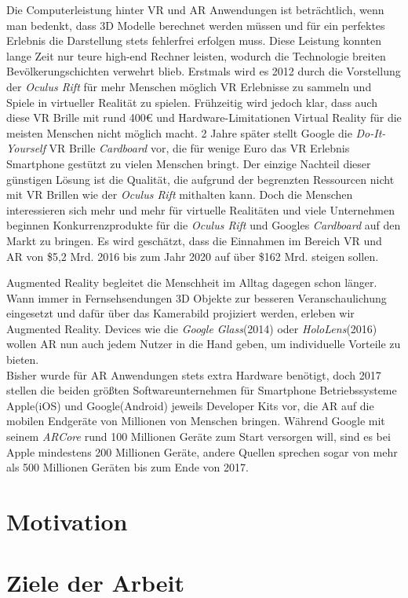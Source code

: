 Die Computerleistung hinter VR und AR Anwendungen ist beträchtlich, wenn man bedenkt, dass 3D Modelle berechnet werden müssen und für ein perfektes Erlebnis die Darstellung stets fehlerfrei erfolgen muss. Diese Leistung konnten lange Zeit nur teure high-end Rechner leisten, wodurch die Technologie breiten Bevölkerungschichten verwehrt blieb. Erstmals wird es 2012 durch die Vorstellung der \emph{Oculus Rift} für mehr Menschen möglich VR Erlebnisse zu sammeln und Spiele in virtueller Realität zu spielen. Frühzeitig wird jedoch klar, dass auch diese VR Brille mit rund 400€ und Hardware-Limitationen Virtual Reality für die meisten Menschen nicht möglich macht. 2 Jahre später stellt Google die \emph{Do-It-Yourself} VR Brille \emph{Cardboard} vor, die für wenige Euro das VR Erlebnis Smartphone gestützt zu vielen Menschen bringt. Der einzige Nachteil dieser günstigen Lösung ist die Qualität, die aufgrund der begrenzten Ressourcen nicht mit VR Brillen wie der \emph{Oculus Rift} mithalten kann. Doch die Menschen interessieren sich mehr und mehr für virtuelle Realitäten und viele Unternehmen beginnen Konkurrenzprodukte für die \emph{Oculus Rift} und Googles \emph{Cardboard} auf den Markt zu bringen. Es wird geschätzt, dass die Einnahmen im Bereich VR und AR von \$5,2 Mrd. 2016 bis zum Jahr 2020 auf über \$162 Mrd. steigen sollen.\cite{augEco_1}\par
Augmented Reality begleitet die Menschheit im Alltag dagegen schon länger. Wann immer in Fernsehsendungen 3D Objekte zur besseren Veranschaulichung eingesetzt und dafür über das Kamerabild projiziert werden, erleben wir Augmented Reality. Devices wie die \emph{Google Glass}(2014) oder \emph{HoloLens}(2016) wollen AR nun auch jedem Nutzer in die Hand geben, um individuelle Vorteile zu bieten.\\
Bisher wurde für AR Anwendungen stets extra Hardware benötigt, doch 2017 stellen die beiden größten Softwareunternehmen für Smartphone Betriebssysteme Apple(iOS) und Google(Android) jeweils Developer Kits vor, die AR auf die mobilen Endgeräte von Millionen von Menschen bringen. Während Google mit seinem \emph{ARCore} rund 100 Millionen Geräte zum Start versorgen will\cite{augGoogle_1}, sind es bei Apple mindestens 200 Millionen Geräte\cite{augApple_1}, andere Quellen sprechen sogar von mehr als 500 Millionen Geräten bis zum Ende von 2017\cite{augApple_2}.
\section{Motivation} 
\section{Ziele der Arbeit}
